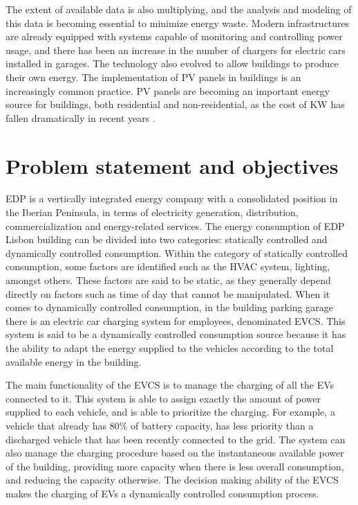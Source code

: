 The extent of available data is also multiplying, and the analysis and modeling of this data is becoming essential to minimize energy waste. Modern infrastructures are already equipped with systems capable of monitoring and controlling power usage, and there has been an increase in the number of chargers for electric cars installed in garages. The technology also evolved to allow buildings to produce their own energy. The implementation of \ac{PV} panels in buildings is an increasingly common practice. \ac{PV} panels are becoming an important energy source for buildings, both  residential and non-residential, as the cost of KW has fallen dramatically in recent years \cite{pvedp}. 









\section{Problem statement and objectives}


\ac{EDP} is a vertically integrated energy company with a consolidated position in the Iberian Peninsula, in terms of electricity generation, distribution, commercialization and energy-related services. The energy consumption of \ac{EDP} Lisbon building can be divided into two categories: statically controlled and dynamically controlled consumption. Within the category of statically controlled consumption, some factors are identified such as the \ac{HVAC} system, lighting, amongst others. These factors are said to be static, as they generally depend directly on factors such as time of day that cannot be manipulated. When it comes to dynamically controlled consumption, in the building parking garage there is an electric car charging system for employees, denominated \ac{EVCS}. This system is said to be a dynamically controlled consumption source because it has the ability to adapt the energy supplied to the vehicles according to the total available energy in the building. 

The main functionality of the \ac{EVCS} is to manage the charging of all the \ac{EV}s connected to it. This system is able to assign exactly the amount of power supplied to each vehicle, and is able to prioritize the charging. For example, a vehicle that already has 80$\%$ of battery capacity, has less priority than a discharged vehicle that has been recently connected to the grid. The system can also manage the charging procedure based on the instantaneous available power of the building, providing more capacity when there is less overall consumption, and reducing the capacity otherwise. The decision making ability of the \ac{EVCS} makes the charging of \ac{EV}s a dynamically controlled consumption process. 

